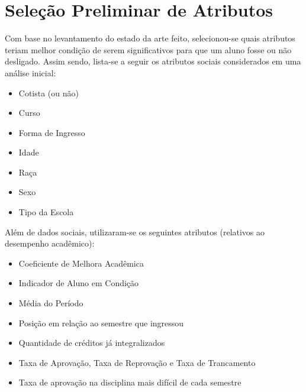 \section{Seleção Preliminar de Atributos}
Com base no levantamento do estado da arte feito, selecionou-se quais atributos
teriam melhor condição de serem significativos para que um aluno fosse ou não
desligado. Assim sendo, lista-se a seguir os atributos sociais considerados em uma análise
inicial:
\begin{itemize}
        \item Cotista (ou não)
        \item Curso
        \item Forma de Ingresso
        \item Idade
        \item Raça
        \item Sexo
        \item Tipo da Escola 
\end{itemize}

Além de dados sociais, utilizaram-se os seguintes atributos (relativos ao desempenho
acadêmico): 
\begin{itemize}
    \item Coeficiente de Melhora Acadêmica
    \item Indicador de Aluno em Condição
    \item Média do Período
    \item Posição em relação ao semestre que ingressou
    \item Quantidade de créditos já integralizados
    \item Taxa de Aprovação, Taxa de Reprovação e Taxa de Trancamento
    \item Taxa de aprovação na disciplina mais difícil de cada semestre
\end{itemize}

